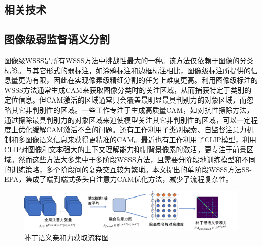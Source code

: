 \begin{CJK*}{UTF8}{zhhei}
    \vskip 1mm
    \section{相关技术}
\end{CJK*}



\begin{CJK*}{UTF8}{zhhei}
    \subsection{图像级弱监督语义分割}
\end{CJK*}

图像级WSSS是所有WSSS方法中挑战性最大的一种。该方法仅依赖于图像的分类标签。与其它形式的弱标注，如涂鸦标注和边框标注相比，图像级标注所提供的信息量更为有限，因此在实现像素级精细分割的任务上难度更高。利用图像级标注的WSSS方法通常生成CAM来获取图像分类时的关注区域，从而捕获特定于类别的定位信息\cite{42ahn2018learning}。但CAM激活的区域通常只会覆盖最明显最具判别力的对象区域，而忽略其它非判别性的区域。一些工作专注于生成高质量CAM，如对抗性擦除方法\cite{04wei2017object}，通过擦除最具判别力的对象区域来迫使模型关注其它非判别性的区域，可以一定程度上优化缓解CAM激活不全的问题。还有工作利用子类别探索\cite{05chang2020weakly}、自监督注意力机制\cite{06wang2020self}和多图像语义信息\cite{07li2021group}来获得更精准的CAM。最近也有工作\cite{08xie2022clims,09lin2023clip}利用了CLIP\cite{10radford2021learning}模型，利用CLIP对图像和文本强大的上下文理解能力抑制背景像素的激活，更专注于前景区域。然而这些方法大多集中于多阶段WSSS方法，且需要分阶段地训练模型和不同的训练策略，多个阶段间的复杂交互较为繁琐。本文提出的单阶段WSSS方法SS-EPA，集成了端到端式多头自注意力CAM优化方法，减少了流程复杂性。 

\vspace{2mm}

\begin{figure}[htbp]
    \centerline{\includegraphics[width=6in]{fig/fig2.pdf}}
    \begin{CJK*}{UTF8}{fs}
        \caption{补丁语义亲和力获取流程图}\label{fig2}
    \end{CJK*}
\end{figure}

